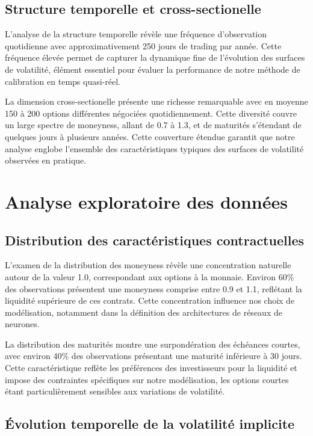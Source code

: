 \subsection{Structure temporelle et cross-sectionelle}

L'analyse de la structure temporelle révèle une fréquence d'observation quotidienne avec approximativement 250 jours de trading par année. Cette fréquence élevée permet de capturer la dynamique fine de l'évolution des surfaces de volatilité, élément essentiel pour évaluer la performance de notre méthode de calibration en temps quasi-réel.

La dimension cross-sectionelle présente une richesse remarquable avec en moyenne 150 à 200 options différentes négociées quotidiennement. Cette diversité couvre un large spectre de moneyness, allant de 0.7 à 1.3, et de maturités s'étendant de quelques jours à plusieurs années. Cette couverture étendue garantit que notre analyse englobe l'ensemble des caractéristiques typiques des surfaces de volatilité observées en pratique.

\section{Analyse exploratoire des données}

\subsection{Distribution des caractéristiques contractuelles}

L'examen de la distribution des moneyness révèle une concentration naturelle autour de la valeur 1.0, correspondant aux options à la monnaie. Environ 60\% des observations présentent une moneyness comprise entre 0.9 et 1.1, reflétant la liquidité supérieure de ces contrats. Cette concentration influence nos choix de modélisation, notamment dans la définition des architectures de réseaux de neurones.

La distribution des maturités montre une surpondération des échéances courtes, avec environ 40\% des observations présentant une maturité inférieure à 30 jours. Cette caractéristique reflète les préférences des investisseurs pour la liquidité et impose des contraintes spécifiques sur notre modélisation, les options courtes étant particulièrement sensibles aux variations de volatilité.

\subsection{Évolution temporelle de la volatilité implicite}

